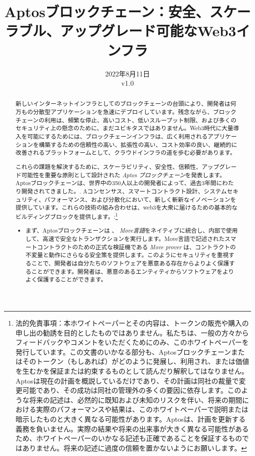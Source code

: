 \documentclass{article}
\title{Aptosブロックチェーン：安全、スケーラブル、アップグレード可能なWeb3インフラ}
\author{}
\date{2022年8月11日\\v1.0}
\begin{document}
\maketitle

\renewcommand{\abstractname}{要約}
\renewcommand{\figurename}{絵}

\begin{abstract}
新しいインターネットインフラとしてのブロックチェーンの台頭により、開発者は何万もの分散型アプリケーションを急速にデプロイしています。残念ながら、ブロックチェーンの利用は、頻繁な停止、高いコスト、低いスループット制限、および多くのセキュリティ上の懸念のために、まだユビキタスではありません。Web3時代に大量導入を可能にするためには、ブロックチェーンインフラは、広く利用されるアプリケーションを構築するための信頼性の高い、拡張性の高い、コスト効率の良い、継続的に改善されるプラットフォームとして、クラウドインフラの道を歩む必要があります。

これらの課題を解決するために、スケーラビリティ、安全性、信頼性、アップグレード可能性を重要な原則として設計された \emph{Aptos ブロックチェーン}を発表します。Aptosブロックチェーンは、世界中の350人以上の開発者によって、過去3年間にわたり開発されてきました。\cite{aptos_core_github}. Aコンセンサス、スマートコントラクト設計、システムセキュリティ、パフォーマンス、および分散化において、新しく斬新なイノベーションを提供しています。これらの技術の組み合わせは、web3を大衆に届けるための基本的なビルディングブロックを提供します。:\footnote{法的免責事項：本ホワイトペーパーとその内容は、トークンの販売や購入の申し出の勧誘を目的としたものではありません。私たちは、一般の方々からフィードバックやコメントをいただくためにのみ、このホワイトペーパーを発行しています。この文書のいかなる部分も、Aptosブロックチェーンまたはそのトークン（もしあれば）がどのように発展し、利用され、または価値を生むかを保証または約束するものとして読んだり解釈してはなりません。Aptosは現在の計画を概説しているだけであり、その計画は同社の裁量で変更可能であり、その成功は同社の管理外の多くの要因に依存します。このような将来の記述は、必然的に既知および未知のリスクを伴い、将来の期間における実際のパフォーマンスや結果は、このホワイトペーパーで説明または暗示したものと大きく異なる可能性があります。Aptosは、計画を更新する義務を負いません。実際の結果や将来の出来事が大きく異なる可能性があるため、ホワイトペーパーのいかなる記述も正確であることを保証するものではありません。将来の記述に過度の信頼を置かないようにお願いします。}
 
 \begin{itemize}
  \item まず、Aptosブロックチェーンは 、 \emph{Move言語}をネイティブに統合し、内部で使用して、高速で安全なトランザクションを実行します\cite{move_github}。Move言語で記述されたスマートコントラクトのための正式な検証機である \emph{Move prover} は、コントラクトの不変量と動作にさらなる安全策を提供します。このようにセキュリティを重視することで、開発者は自分たちのソフトウェアを悪意ある存在からよりよく保護することができます。開発者は、悪意のあるエンティティからソフトウェアをよりよく保護することができます。
  

\end{itemize}
\end{abstract}
\end{document}
